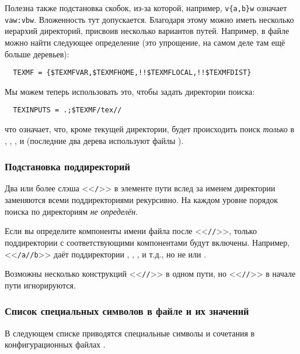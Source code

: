 \documentclass{article}
\renewcommand{\samp}[1]{<<\texttt{#1}>>}
\begin{document}
Полезна также подстановка скобок, из-за которой, например,
\verb+v{a,b}w+ означает \verb+vaw:vbw+. Вложенность тут допускается.
Благодаря этому можно иметь несколько иерархий директорий, присвоив
 несколько вариантов путей.
Например, в файле  можно найти следующее определение
(это упрощение, на самом деле там ещё больше деревьев): 
\begin{verbatim}
  TEXMF = {$TEXMFVAR,$TEXMFHOME,!!$TEXMFLOCAL,!!$TEXMFDIST}
\end{verbatim}
Мы можем теперь использовать это, чтобы задать директории поиска:
\begin{verbatim}
  TEXINPUTS = .;$TEXMF/tex//
\end{verbatim}
что означает, что, кроме текущей директории, будет происходить поиск
\emph{только} в , ,
, и  (последние два
дерева используют файлы ). 

\subsubsection{Подстановка поддиректорий}
\label{sec:subdirectory-expansion}

Два или более слэша \samp{/} в элементе пути вслед за именем директории
 заменяются всеми поддиректориями  рекурсивно. На каждом
уровне порядок поиска по директориям  \emph{не определён}.

Если вы определите компоненты имени файла после \samp{//}, только
поддиректории с соответствующими компонентами будут включены.
Например, \samp{/a//b} даёт поддиректории ,
, , и т.д., но не  или
.

Возможны несколько конструкций \samp{//} в одном пути, но 
\samp{//} в начале пути игнорируются.

\subsubsection{Список специальных символов в файле  и их значений}
\label{sec:cnf-special-chars}

В следующем списке приводятся специальные символы и сочетания в конфигурационных
файлах  \KPS{}.
\end{document}
